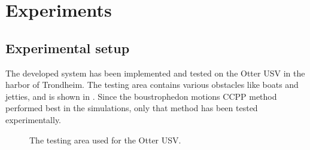 \chapter{Experiments}

\section{Experimental setup}

The developed system has been implemented and tested on the Otter USV in the harbor of Trondheim. The testing area contains various obstacles like boats and jetties, and is shown in . Since the boustrophedon motions CCPP method performed best in the simulations, only that method has been tested experimentally.

\begin{figure}[h!]
    \centering
	\caption{The testing area used for the Otter USV.}
	\label{fig:testing-arena}
\end{figure}


